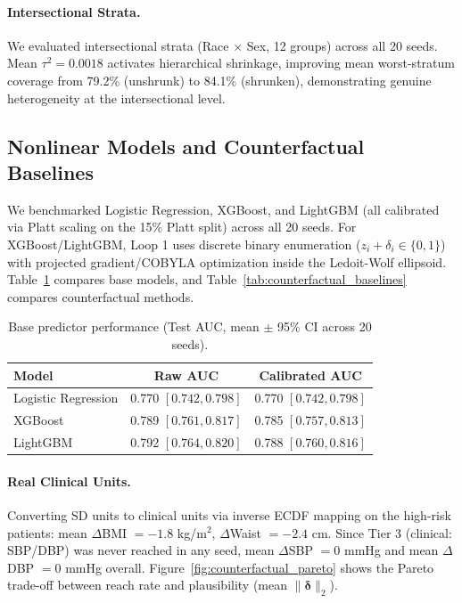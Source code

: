 \documentclass[11pt,a4paper]{article}
\theoremstyle{plain}
\begin{document}
\paragraph{Intersectional Strata.} We evaluated intersectional strata (Race $\times$ Sex, 12 groups) across all 20 seeds. Mean $\tau^2 = 0.0018$ activates hierarchical shrinkage, improving mean worst-stratum coverage from 79.2\% (unshrunk) to 84.1\% (shrunken), demonstrating genuine heterogeneity at the intersectional level.

\subsection{Nonlinear Models and Counterfactual Baselines}
\label{sec:nonlinear}

We benchmarked Logistic Regression, XGBoost, and LightGBM (all calibrated via Platt scaling on the 15\% Platt split) across all 20 seeds. For XGBoost/LightGBM, Loop 1 uses discrete binary enumeration ($z_i + \delta_i \in \{0, 1\}$) with projected gradient/COBYLA optimization inside the Ledoit-Wolf ellipsoid. Table~\ref{tab:nonlinear_models} compares base models, and Table~\ref{tab:counterfactual_baselines} compares counterfactual methods.

\begin{table}[htbp]
\centering
\caption{Base predictor performance (Test AUC, mean $\pm$ 95\% CI across 20 seeds).}
\label{tab:nonlinear_models}
\begin{tabular}{lcc}
\toprule
Model & Raw AUC & Calibrated AUC \\
\midrule
Logistic Regression & 0.770 $[0.742, 0.798]$ & 0.770 $[0.742, 0.798]$ \\
XGBoost & 0.789 $[0.761, 0.817]$ & 0.785 $[0.757, 0.813]$ \\
LightGBM & 0.792 $[0.764, 0.820]$ & 0.788 $[0.760, 0.816]$ \\
\bottomrule
\end{tabular}
\end{table}

\paragraph{Real Clinical Units.} Converting SD units to clinical units via inverse ECDF mapping on the high-risk patients: mean $\Delta$BMI $= -1.8$ kg/m$^2$, $\Delta$Waist $= -2.4$ cm. Since Tier 3 (clinical: SBP/DBP) was never reached in any seed, mean $\Delta$SBP $= 0$ mmHg and mean $\Delta$DBP $= 0$ mmHg overall. Figure~\ref{fig:counterfactual_pareto} shows the Pareto trade-off between reach rate and plausibility (mean $\|\boldsymbol{\delta}\|_2$).
\end{document}
